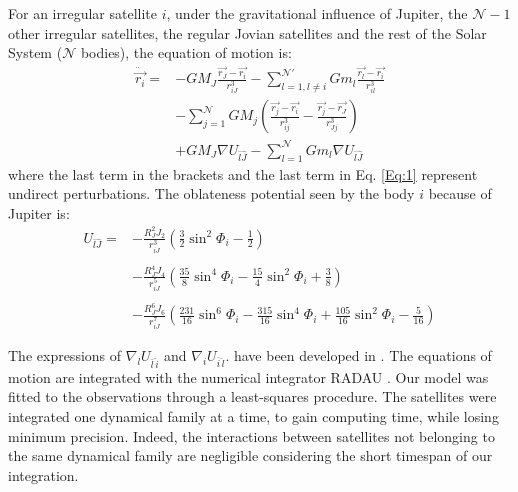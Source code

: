 \documentclass[useAMS,usenatbib]{mn2e}
\begin{document}
For an irregular satellite $i$, under the gravitational influence of Jupiter, the $\mathcal{N}-1$ other irregular satellites, the regular Jovian satellites and the rest of the Solar System ($\mathcal{N}$ bodies), the equation of motion is:
\begin{equation}\begin{array}{ll}

\ddot{\vec{r_i}}= & \displaystyle -GM_J\frac{\vec{r_J}-\vec{r_i}}{r_{iJ}^3}-\sum_{l=1,l\neq i}^\mathcal{N'}Gm_l\frac{\vec{r_l}-\vec{r_i}}{r_{il}^3}\\
&\displaystyle -\sum_{j=1}^\mathcal{N}GM_j \left(\frac{\vec{r_j}-\vec{r_i}}{r_{ij}^3} - \frac{\vec{r_j}-\vec{r_J}}{r_{Jj}^3} \right)\\
 & \displaystyle +GM_J \nabla U_{\bar{l}\hat{J}} -\sum_{l=1}^\mathcal{N} Gm_l\nabla U_{\bar{l}\hat{J}}
\end{array}
\label{Eq:1}
\end{equation}
where the last term in the brackets and the last term in Eq. \ref{Eq:1} represent undirect perturbations. The oblateness potential seen by the body $i$ because of Jupiter is:
\begin{equation}\begin{array}{ll}

U_{\bar{l}\hat{J}}=&\displaystyle -\frac{R_J^2 J_2}{r_{iJ}^3}\left(\frac{3}{2}\sin^2 \Phi_i-\frac{1}{2}\right)\\ &\\ & 
\displaystyle-\frac{R_J^4 J_4}{r_{iJ}^5}\left(\frac{35}{8}\sin^4 \Phi_i-\frac{15}{4}\sin^2 \Phi_i+\frac{3}{8}\right)\\
& \\
&\displaystyle-\frac{R_J^6 J_6}{r_{iJ}^7}\left(\frac{231}{16}\sin^6 \Phi_i-\frac{315}{16}\sin^4 \Phi_i+\frac{105}{16}\sin^2 \Phi_i-\frac{5}{16}\right)

\end{array}
\end{equation}

The expressions of $\nabla_lU_{\bar{l}\, \hat{i}}$ and $\nabla_i U_{\bar{i}\, \hat{l}}.$ have been developed in \citet{Lainey2004}. The equations of motion are integrated with the numerical integrator RADAU \citep{Everhart1985}. 
Our model was fitted to the observations through a least-squares procedure. The satellites were integrated one dynamical family at a time, to gain computing time, while losing minimum precision. Indeed, the interactions between satellites not belonging to the same dynamical family are negligible considering the short timespan of our integration. 
\end{document}
